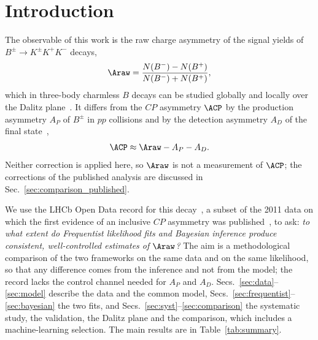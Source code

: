 \section{Introduction}
\label{sec:intro}
The observable of this work is the raw charge asymmetry of the signal yields of $B^{\pm}\to K^{\pm}K^{+}K^{-}$ decays,
\begin{equation}
\Araw=\frac{N(B^-)-N(B^+)}{N(B^-)+N(B^+)} ,
\label{eq:araw}
\end{equation}
which in three-body charmless $B$ decays can be studied globally and locally over the Dalitz plane~\cite{lhcb_cpv_prd2023,lhcb_cpv_paper}. It differs from the $CP$ asymmetry $\ACP$ by the production asymmetry $A_P$ of $B^\pm$ in $pp$ collisions and by the detection asymmetry $A_D$ of the final state~\cite{lhcb_cpv_prd2023},
\begin{equation}
\ACP\approx\Araw-A_P-A_D .
\label{eq:acp}
\end{equation}
Neither correction is applied here, so $\Araw$ is not a measurement of $\ACP$; the corrections of the published analysis are discussed in Sec.~\ref{sec:comparison_published}.

We use the LHCb Open Data record for this decay~\cite{opendata_record,opendata_notebook}, a subset of the 2011 data on which the first evidence of an inclusive $CP$ asymmetry was published~\cite{lhcb_cpv_2013}, to ask: \emph{to what extent do Frequentist likelihood fits and Bayesian inference produce consistent, well-controlled estimates of $\Araw$?} The aim is a methodological comparison of the two frameworks on the same data and on the same likelihood, so that any difference comes from the inference and not from the model; the record lacks the control channel needed for $A_P$ and $A_D$. Secs.~\ref{sec:data}--\ref{sec:model} describe the data and the common model, Secs.~\ref{sec:frequentist}--\ref{sec:bayesian} the two fits, and Secs.~\ref{sec:syst}--\ref{sec:comparison} the systematic study, the validation, the Dalitz plane and the comparison, which includes a machine-learning selection. The main results are in Table~\ref{tab:summary}.

